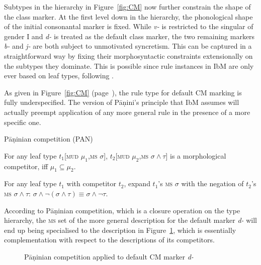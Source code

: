 \documentclass[output=paper]{langsci/langscibook}
\begin{document}
Subtypes in the hierarchy in Figure~\ref{fig:CM} now further constrain
the shape of the class marker. At the first level down in the
hierarchy, the phonological shape of the initial consonantal marker is
fixed. While \textit{v-} is restricted to the singular of gender I and
\textit{d-} is treated as the default class marker, the two remaining
markers \textit{b-} and \textit{j-} are both subject to unmotivated
syncretism. This can be captured in a straightforward way by fixing
their morphosyntactic constraints extensionally on the subtypes they
dominate. This is possible since rule instances in IbM are only ever
based on leaf types, following \citet{Koenig99}. 

As given in Figure~\ref{fig:CM} (page~\pageref{fig:CM}), 
the rule type for default CM marking
is fully underspecified. The version of  Pāṇini's principle that IbM
assumes will actually preempt application of any more general rule in
the presence of a more specific one. 

\ea Pāṇinian competition (PAN) \hfill \citep{Crysmann:14:OUP} 
  \begin{xlistn}
    \ex For any leaf type $t_1$[\textsc{mud} $\mu_1$,\textsc{ms}
    $\sigma$], $t_2$[\textsc{mud} $\mu_2$,\textsc{ms}
    $\sigma \wedge \tau$] is a morphological competitor, iff
    $\mu_1 \subseteq \mu_2$.
    
    \ex For any leaf type $t_1$ with competitor $t_2$, expand
    $t_1$'s \textsc{ms} $\sigma$ with the negation of $t_2$'s
    \textsc{ms} $\sigma \wedge \tau$:
    $\sigma \wedge \neg (\sigma \wedge \tau) \equiv \sigma \wedge
    \neg \tau$.
  \end{xlistn}
\z

According to Pāṇinian competition, which is a closure operation on the
type hierarchy, the \textsc{ms} set of the more general description
for the default marker \textit{d-} will end up being specialised to
the description in Figure~\ref{fig:Panini:BC}, which is essentially
complementation with respect to the descriptions of its
competitors. 

\begin{figure}
  \caption{Pāṇinian competition applied to default CM marker \textit{d-}\label{fig:Panini:BC}}
\end{figure}
\end{document}
